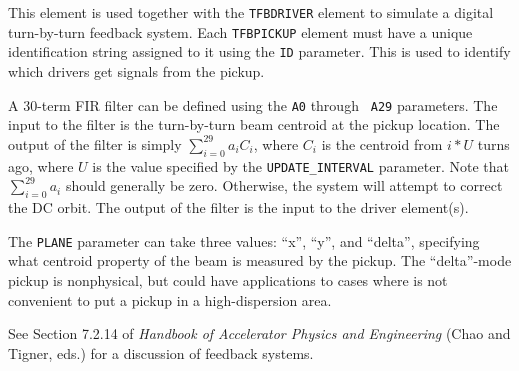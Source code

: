 This element is used together with the {\tt TFBDRIVER} element to
simulate a digital turn-by-turn feedback system.  Each {\tt TFBPICKUP}
element must have a unique identification string assigned to it using
the {\tt ID} parameter.  This is used to identify which drivers get
signals from the pickup.

A 30-term FIR filter can be defined using the {\tt A0} through {\tt
A29} parameters.  The input to the filter is the turn-by-turn beam
centroid at the pickup location.  The output of the filter is simply
$\sum_{i=0}^{29} a_i C_i$, where $C_i$ is the centroid from $i*U$ turns
ago, where $U$ is the value specified by the \verb|UPDATE_INTERVAL| parameter.
Note that $\sum_{i=0}^{29} a_i$ should generally be zero. Otherwise, the
system will attempt to correct the DC orbit.  The output of the filter
is the input to the driver element(s).

The \verb|PLANE| parameter can take three values: ``x'', ``y'', and ``delta'', specifying
what centroid property of the beam is measured by the pickup. The ``delta''-mode pickup
is nonphysical, but could have applications to cases where is not convenient to put a 
pickup in a high-dispersion area.

See Section 7.2.14 of {\em Handbook of Accelerator Physics and Engineering}
(Chao and Tigner, eds.) for a discussion of feedback systems.
